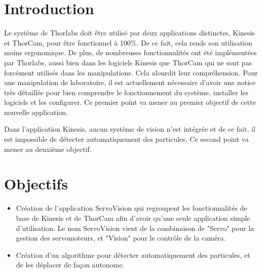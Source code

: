 \section{Introduction}

Le système de Thorlabs doit être utilisé par deux applications distinctes, Kinesis et ThorCam, pour être fonctionnel à 100\%. De ce fait, cela rends son utilisation moins ergonomique. De plus, de nombreuses fonctionnalités ont été implémentées par Thorlabs, aussi bien dans les logiciels Kinesis que ThorCam qui ne sont pas forcément utilisés dans les manipulations. Cela alourdit leur compréhension. Pour une manipulation de laboratoire, il est actuellement nécessaire d'avoir une notice très détaillée pour bien comprendre le fonctionnement du système, installer les logiciels et les configurer. Ce premier point va mener au premier objectif de cette nouvelle application.

Dans l'application Kinesis, aucun système de vision n'est intégrée et de ce fait, il est impossible de détecter automatiquement des particules. Ce second point va mener au deuxième objectif.

\section{Objectifs}
\begin{itemize}[label=\textbullet]
    \item Création de l'application ServoVision qui regroupent les fonctionnalités de base de Kinesis et de ThorCam afin d'avoir qu'une seule application simple d'utilisation. Le nom ServoVision vient de la combinaison de "Servo" pour la gestion des servomoteurs, et "Vision" pour le contrôle de la caméra.
    \item Création d'un algorithme pour détecter automatiquement des particules, et de les déplacer de façon autonome.
\end{itemize}

